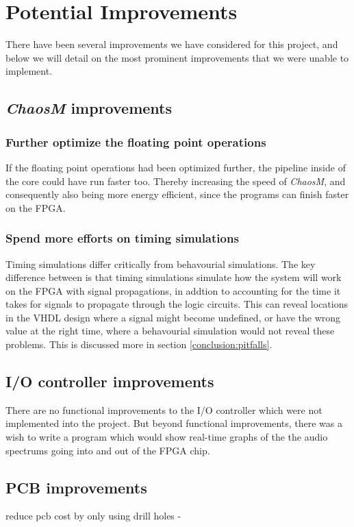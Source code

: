 \section{Potential Improvements}

There have been several improvements we have considered for this project, and
below we will detail on the most prominent improvements that we were unable to
implement.

\subsection{\textit{ChaosM} improvements}
\subsubsection{Further optimize the floating point operations}
If the floating point operations had been optimized further, the pipeline inside of the core could have run faster too.
Thereby increasing the speed of \textit{ChaosM}, and consequently also being more energy efficient, since the programs can finish faster on the FPGA.

\subsubsection{Spend more efforts on timing simulations}
Timing simulations differ critically from behavourial simulations.
The key difference between is that timing simulations simulate how the system will work on the FPGA with signal propagations,
in addtion to accounting for the time it takes for signals to propagate through the logic circuits.
This can reveal locations in the VHDL design where a signal might become undefined, or have the wrong value at the right time, where a behavourial simulation would not reveal these problems.
This is discussed more in section \ref{conclusion:pitfalls}.


\subsection{I/O controller improvements}
There are no functional improvements to the I/O controller which were not implemented into the project.
But beyond functional improvements, there was a wish to write a program which would show
real-time graphs of the the audio spectrums going into and out of the FPGA chip.

\subsection{PCB improvements}
reduce pcb cost by only using drill holes -

